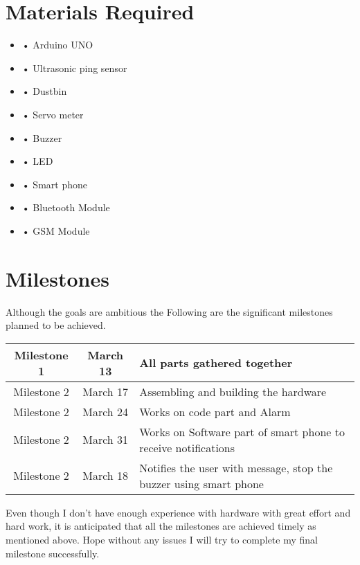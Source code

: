 \documentclass[11pt]{extarticle}
\begin{document}
\section*{Materials Required}
\begin{itemize}
  
   \item •	Arduino UNO
    \item •	Ultrasonic ping sensor
    \item 	•	Dustbin
    \item •	Servo meter
    \item•	Buzzer
   \item •	LED
   \item •	Smart phone
\item•	Bluetooth Module
\item•	GSM Module

\end{itemize}

\section*{Milestones}
Although the goals are ambitious the Following are the significant milestones planned to be achieved.
\begin{table}[h]                           
 \centering
    \begin{tabular}{|c|c|l|}
    \hline
    

     Milestone 1  & March 13  &All parts gathered together  \\ \hline
     Milestone 2  & March 17 & Assembling and building the hardware \\ \hline
     Milestone 2  & March 24 & Works on code part and Alarm  \\ \hline
     Milestone 2  & March 31 & Works on Software part of smart phone to receive notifications  \\ \hline
     Milestone 2  & March 18 & Notifies the user with message, stop the buzzer using smart phone \\ \hline
    

    \end{tabular}
   
\end{table}





Even though I don’t have enough experience with hardware with great effort and hard work, it is anticipated that all the milestones are achieved timely as mentioned above. Hope without any issues I will try to complete my final milestone successfully. 
\end{document}
